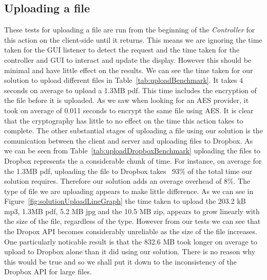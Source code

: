 \documentclass[12pt, titlepage]{article}
\begin{document}
\subsection{Uploading a file}
These tests for uploading a file are run from the beginning of the \textit{Controller} for this action on the client-side until it returns. This means we are ignoring the time taken for the GUI listener to detect the request and the time taken for the controller and GUI to interact and update the display. However this should be minimal and have little effect on the results.
\newline \indent We can see the time taken for our solution to upload different files in Table~\ref{tab:uploadBenchmark}. It takes 4 seconds on average to upload a 1.3MB pdf. This time includes the encryption of the file before it is uploaded. As we saw when looking for an AES provider, it took on average of 0.011 seconds to encrypt the same file using AES. It is clear that the cryptography has little to no effect on the time this action takes to complete. The other substantial stages of uploading a file using our solution is the comunication between the client and server and uploading files to Dropbox. As we can be seen from Table~\ref{tab:uploadDropboxBenchmark} uploading the files to Dropbox represents the a considerable chunk of time. For instance, on average for the 1.3MB pdf, uploading the file to Dropbox takes ~93\% of the total time our solution requires. Therefore our solution adds an overage overhead of 8\%.
\newline \indent The type of file we are uploading appears to make little difference. As we can see in Figure~\ref{fig:solutionUploadLineGraph} the time taken to upload the 203.2 kB mp3, 1.3MB pdf, 5.2 MB jpg and the 10.5 MB zip, appears to grow linearly with the size of the file, regardless of the type. However from our tests we can see that the Dropox API becomes considerably unreliable as the size of the file increases. One particularly noticable result is that the 832.6 MB took longer on average to upload to Dropbox alone than it did using our solution. There is no reason why this would be true and so we shall put it down to the inconsistency of the Dropbox API for large files.
\end{document}
